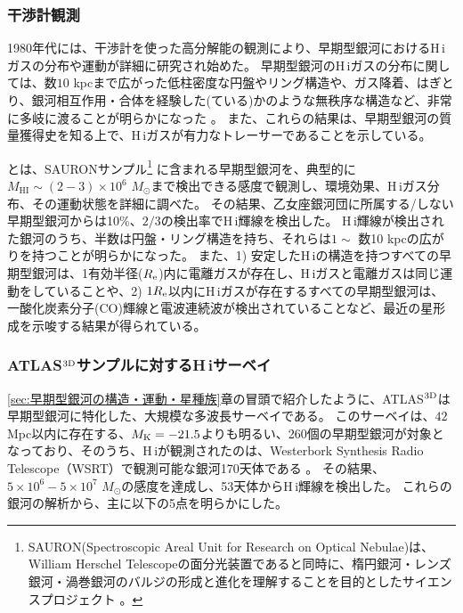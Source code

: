 \subsubsection{干渉計観測}

1980年代には、干渉計を使った高分解能の観測により、早期型銀河におけるH\,{\sc i}ガスの分布や運動が詳細に研究され始めた。
早期型銀河のH\,{\sc i}ガスの分布に関しては、数$10$ kpcまで広がった低柱密度な円盤やリング構造や、ガス降着、はぎとり、銀河相互作用・合体を経験した(ている)かのような無秩序な構造など、非常に多岐に渡ることが明らかになった \citep[レビューとしては][]{1997ASPC..116..310V,2001ASPC..240..657H}。
また、これらの結果は、早期型銀河の質量獲得史を知る上で、H\,{\sc i}ガスが有力なトレーサーであることを示している。

\citet{2006MNRAS.371..157M}と\citet{2010MNRAS.409..500O}は、SAURONサンプル\footnote{
SAURON(Spectroscopic Areal Unit for Research on Optical Nebulae)は、William Herschel Telescopeの面分光装置であると同時に、楕円銀河・レンズ銀河・渦巻銀河のバルジの形成と進化を理解することを目的としたサイエンスプロジェクト \citep{2001MNRAS.326...23B}。
}
に含まれる早期型銀河を、典型的に$M_\mathrm{HI}\sim (2-3)\times10^6$ $M_\odot$まで検出できる感度で観測し、環境効果、H\,{\sc i}ガス分布、その運動状態を詳細に調べた。
その結果、乙女座銀河団に所属する/しない早期型銀河からは10\%、$2/3$の検出率でH\,{\sc i}輝線を検出した。
H\,{\sc i}輝線が検出された銀河のうち、半数は円盤・リング構造を持ち、それらは$1\sim$ 数10 kpcの広がりを持つことが明らかになった。
また、1) 安定したH\,{\sc i}の構造を持つすべての早期型銀河は、1有効半径($R_{\rm e}$)内に電離ガスが存在し、H\,{\sc i}ガスと電離ガスは同じ運動をしていることや、2) $1R_{\rm e}$以内にH\,{\sc i}ガスが存在するすべての早期型銀河は、一酸化炭素分子(CO)輝線と電波連続波が検出されていることなど、最近の星形成を示唆する結果が得られている。

\subsubsection{ATLAS$^{\rm 3D}$サンプルに対するH\,{\sc i}サーベイ}

\ref{sec:早期型銀河の構造・運動・星種族}章の冒頭で紹介したように、ATLAS$^{\rm 3D}$は早期型銀河に特化した、大規模な多波長サーベイである。
このサーベイは、$42$ Mpc以内に存在する、$M_{\rm K}=-21.5$よりも明るい、260個の早期型銀河が対象となっており、そのうち、H\,{\sc i}が観測されたのは、Westerbork Synthesis Radio Telescope（WSRT）で観測可能な銀河170天体である \citep{2012MNRAS.422.1835S}。
その結果、$5\times10^6-5\times10^7$ $M_\odot$の感度を達成し、53天体からH\,{\sc i}輝線を検出した。
これらの銀河の解析から、主に以下の5点を明らかにした。

